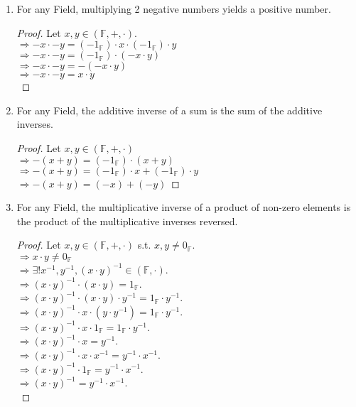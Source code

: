 \documentclass{article}
\begin{document}
\begin{enumerate}
				\item For any Field, multiplying 2 negative numbers yields a positive number.
				\begin{proof}
					Let $x, y \in (\mathbb{F}, +, \cdot)$.\\
					$\Rightarrow -x \cdot -y = (-1_\mathbb{F}) \cdot x \cdot (-1_\mathbb{F}) \cdot y$\\
					$\Rightarrow -x \cdot -y = (-1_\mathbb{F}) \cdot (-x \cdot  y)$\\
					$\Rightarrow -x \cdot -y = -(-x \cdot  y)$\\
					$\Rightarrow -x \cdot -y = x \cdot  y$\\
				\end{proof}

				\item For any Field, the additive inverse of a sum is the sum of the additive inverses.
				\begin{proof}
					Let $x, y \in (\mathbb{F}, +, \cdot)$\\
					$\Rightarrow -(x + y) = (-1_\mathbb{F}) \cdot (x + y)$\\
					$\Rightarrow -(x + y) = (-1_\mathbb{F}) \cdot x + (-1_\mathbb{F}) \cdot y$\\
					$\Rightarrow -(x + y) = (-x) + (-y)$
				\end{proof}

				\item For any Field, the multiplicative inverse of a product of non-zero elements is the product of the multiplicative inverses reversed.
				\begin{proof}
					Let $x, y \in (\mathbb{F}, +, \cdot)$ s.t. $x, y \neq 0_{\mathbb{F}}$.\\
					$\Rightarrow x \cdot y \neq 0_\mathbb{F}$ \\
					$\Rightarrow \exists ! x^{-1}, y^{-1}, (x \cdot y)^{-1} \in (\mathbb{F}, \cdot)$.\\
					$\Rightarrow (x \cdot y)^{-1} \cdot (x \cdot y) = 1_\mathbb{F}$.\\
					$\Rightarrow (x \cdot y)^{-1} \cdot (x \cdot y) \cdot y^{-1} = 1_\mathbb{F} \cdot y^{-1}$.\\
					$\Rightarrow (x \cdot y)^{-1} \cdot x \cdot (y \cdot y^{-1}) = 1_\mathbb{F} \cdot y^{-1}$.\\
					$\Rightarrow (x \cdot y)^{-1} \cdot x \cdot 1_\mathbb{F} = 1_\mathbb{F} \cdot y^{-1}$.\\
					$\Rightarrow (x \cdot y)^{-1} \cdot x = y^{-1}$.\\
					$\Rightarrow (x \cdot y)^{-1} \cdot x \cdot x^{-1} = y^{-1} \cdot x^{-1}$.\\
					$\Rightarrow (x \cdot y)^{-1} \cdot 1_\mathbb{F} = y^{-1} \cdot x^{-1}$.\\
					$\Rightarrow (x \cdot y)^{-1} = y^{-1} \cdot x^{-1}$.\\
				\end{proof}
			\end{enumerate}
\end{document}
